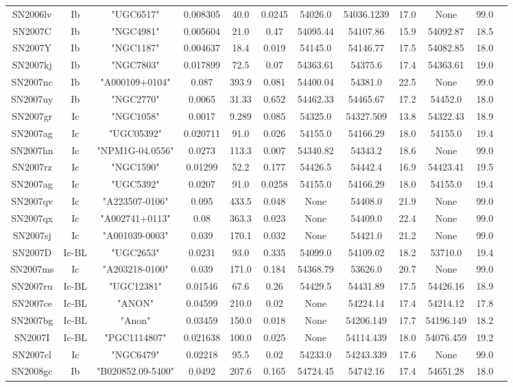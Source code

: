 \documentclass[onecolumn]{aa} %
\begin{document}
\begin{table*}
\begin{tabular}{cccccccccccc}
SN2006lv&Ib&"UGC6517"&0.008305&40.0&0.0245&54026.0&54036.1239&17.0&None&99.0\\ 
SN2007C&Ib&"NGC4981"&0.005604&21.0&0.47&54095.44&54107.86&15.9&54092.87&18.5\\ 
SN2007Y&Ib&"NGC1187"&0.004637&18.4&0.019&54145.0&54146.77&17.5&54082.85&18.0\\ 
SN2007kj&Ib&"NGC7803"&0.017899&72.5&0.07&54363.61&54375.6&17.4&54363.61&19.0\\ 
SN2007nc&Ib&"A000109+0104"&0.087&393.9&0.081&54400.04&54381.0&22.5&None&99.0\\ 
SN2007uy&Ib&"NGC2770"&0.0065&31.33&0.652&54462.33&54465.67&17.2&54452.0&18.0\\ 
SN2007gr&Ic&"NGC1058"&0.0017&9.289&0.085&54325.0&54327.509&13.8&54322.43&18.9\\ 
SN2007ag&Ic&"UGC05392"&0.020711&91.0&0.026&54155.0&54166.29&18.0&54155.0&19.4\\ 
SN2007hn&Ic&"NPM1G-04.0556"&0.0273&113.3&0.007&54340.82&54343.2&18.6&None&99.0\\ 
SN2007rz&Ic&"NGC1590"&0.01299&52.2&0.177&54426.5&54442.4&16.9&54423.41&19.5\\ 
SN2007ag&Ic&"UGC5392"&0.0207&91.0&0.0258&54155.0&54166.29&18.0&54155.0&19.4\\ 
SN2007qv&Ic&"A223507-0106"&0.095&433.5&0.048&None&54408.0&21.9&None&99.0\\ 
SN2007qx&Ic&"A002741+0113"&0.08&363.3&0.023&None&54409.0&22.4&None&99.0\\ 
SN2007sj&Ic&"A001039-0003"&0.039&170.1&0.032&None&54421.0&21.2&None&99.0\\ 
SN2007D&Ic-BL&"UGC2653"&0.0231&93.0&0.335&54099.0&54109.02&18.2&53710.0&19.4\\ 
SN2007ms&Ic&"A203218-0100"&0.039&171.0&0.184&54368.79&53626.0&20.7&None&99.0\\ 
SN2007ru&Ic-BL&"UGC12381"&0.01546&67.6&0.26&54429.5&54431.89&17.5&54426.16&18.9\\ 
SN2007ce&Ic-BL&"ANON"&0.04599&210.0&0.02&None&54224.14&17.4&54214.12&17.8\\ 
SN2007bg&Ic-BL&"Anon"&0.03459&150.0&0.018&None&54206.149&17.7&54196.149&18.2\\ 
SN2007I&Ic-BL&"PGC1114807"&0.021638&100.0&0.025&None&54114.439&18.0&54076.459&19.2\\ 
SN2007cl&Ic&"NGC6479"&0.02218&95.5&0.02&54233.0&54243.339&17.6&None&99.0\\ 
SN2008gc&Ib&"B020852.09-5400"&0.0492&207.6&0.165&54724.45&54742.16&17.4&54651.28&18.0\\ 

\end{tabular}
\end{table*}
\end{document}
